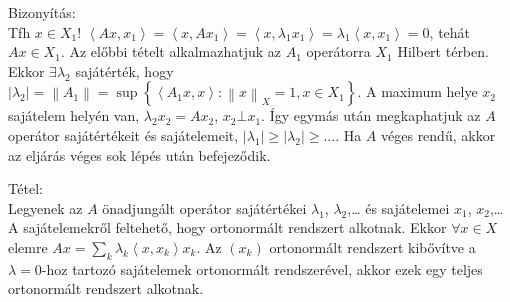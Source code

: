 \documentclass[12pt,a4paper]{scrartcl}
\newenvironment{tetel}{}{}
\newenvironment{bizonyitas}{}{}
\begin{document}
\begin{bizonyitas}

Bizonyítás:\\
Tfh \(x \in X_{1}\)!
\(\left\langle {Ax,x_{1}} \right\rangle = \left\langle {x,Ax_{1}} \right\rangle = \left\langle {x,\lambda_{1}x_{1}} \right\rangle = \lambda_{1}\left\langle {x,x_{1}} \right\rangle = 0\),
tehát \(Ax \in X_{1}\). Az előbbi tételt alkalmazhatjuk az \(A_{1}\)
operátorra \(X_{1}\) Hilbert térben. Ekkor \(\exists\lambda_{2}\)
sajátérték, hogy
\(\left| \lambda_{2} \right| = \left\| A_{1} \right\| = \sup\left\{ {\left\langle {A_{1}x,x} \right\rangle:\left\| x \right\|_{X} = 1,x \in X_{1}} \right\}\).
A maximum helye \(x_{2}\) sajátelem helyén van,
\(\lambda_{2}x_{2} = Ax_{2}\), \(x_{2}\bot x_{1}\). Így egymás után
megkaphatjuk az \(A\) operátor sajátértékeit és sajátelemeit,
\(\left| \lambda_{1} \right| \geq \left| \lambda_{2} \right| \geq ...\).
Ha \(A\) véges rendű, akkor az eljárás véges sok lépés után befejeződik.

\end{bizonyitas}

\begin{tetel}

Tétel:\\
Legyenek az \(A\) önadjungált operátor sajátértékei \(\lambda_{1}\),
\(\lambda_{2}\),\ldots{} és sajátelemei \(x_{1}\), \(x_{2}\),\ldots{} A
sajátelemekről feltehető, hogy ortonormált rendszert alkotnak. Ekkor
\(\forall x \in X\) elemre
\(Ax = {\sum\limits_{k}{\lambda_{k}\left\langle {x,x_{k}} \right\rangle x_{k}}}\).
Az \(\left( x_{k} \right)\) ortonormált rendszert kibővítve a
\(\lambda = 0\)-hoz tartozó sajátelemek ortonormált rendszerével, akkor
ezek egy teljes ortonormált rendszert alkotnak.

\end{tetel}
\end{document}
